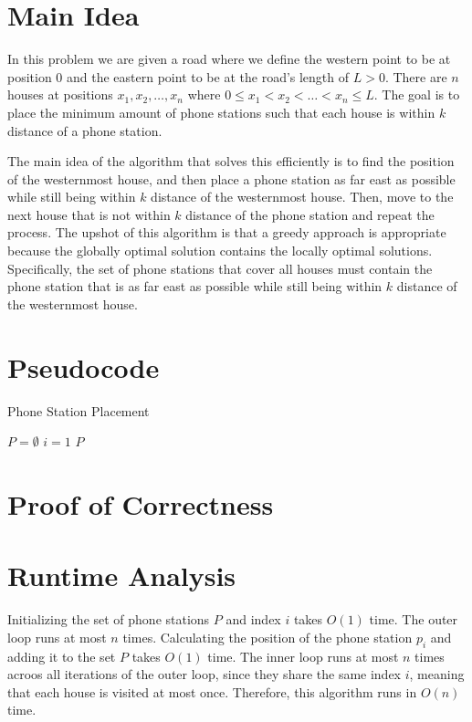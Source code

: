 \documentclass{article}
\begin{document}
\section{Main Idea}

In this problem we are given a road where we define the western point to be at position 0 and the eastern point to be at the road's length of $L > 0$.
There are $n$ houses at positions $x_1, x_2, \ldots, x_n$ where $0 \leq x_1 < x_2 < \ldots < x_n \leq L$.
The goal is to place the minimum amount of phone stations such that each house is within $k$ distance of a phone station.

The main idea of the algorithm that solves this efficiently is to find the position of the westernmost house, and then place a phone station as far east as possible while still being within $k$ distance of the westernmost house.
Then, move to the next house that is not within $k$ distance of the phone station and repeat the process.
The upshot of this algorithm is that a greedy approach is appropriate because the globally optimal solution contains the locally optimal solutions.
Specifically, the set of phone stations that cover all houses must contain the phone station that is as far east as possible while still being within $k$ distance of the westernmost house.

\section{Pseudocode}

\begin{algorithm}[H]
\caption{Phone Station Placement}
\BlankLine
$P = \emptyset$ 
$i = 1$\;
\Return $P$\;
\end{algorithm}

\section{Proof of Correctness}



\section{Runtime Analysis}

Initializing the set of phone stations $P$ and index $i$ takes $O(1)$ time.
The outer loop runs at most $n$ times.
Calculating the position of the phone station $p_i$ and adding it to the set $P$ takes $O(1)$ time.
The inner loop runs at most $n$ times acroos all iterations of the outer loop, since they share the same index $i$, meaning that each house is visited at most once.
Therefore, this algorithm runs in $O(n)$ time.
\end{document}
